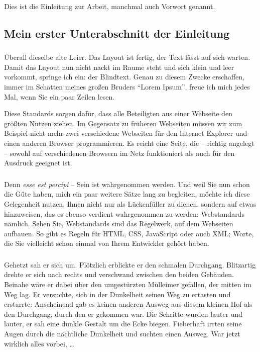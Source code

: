 
\thispagestyle{empty}
\label{sec:einleitung}
%
Dies ist die Einleitung zur Arbeit, manchmal auch Vorwort genannt.
%
\subsection*{Mein erster Unterabschnitt der Einleitung}
\subsubsection{}
Überall dieselbe alte Leier. 
Das Layout ist fertig, der Text lässt auf sich warten. 
Damit das Layout nun nicht nackt im Raume steht und sich klein und leer vorkommt, springe ich ein: der Blindtext. 
Genau zu diesem Zwecke erschaffen, immer im Schatten meines großen Bruders \enquote{Lorem Ipsum}, freue ich mich jedes Mal, wenn Sie ein paar Zeilen lesen. 

Diese Standards sorgen dafür, dass alle Beteiligten aus einer Webseite den größten Nutzen ziehen.
Im Gegensatz zu früheren Webseiten müssen wir zum Beispiel nicht mehr zwei verschiedene Webseiten für den Internet Explorer und einen anderen Browser programmieren.
Es reicht eine Seite, die -- richtig angelegt -- sowohl auf verschiedenen Browsern im Netz funktioniert als auch für den Ausdruck geeignet ist.
\subsubsection{}
Denn \emph{esse est percipi} -- Sein ist wahrgenommen werden. Und weil Sie nun schon die Güte haben, mich ein paar weitere Sätze lang zu begleiten, möchte ich diese Gelegenheit nutzen, Ihnen nicht nur als Lückenfüller zu dienen, sondern auf etwas hinzuweisen, das es ebenso verdient wahrgenommen zu werden: Webstandards nämlich. Sehen Sie, Webstandards sind das Regelwerk, auf dem Webseiten aufbauen. So gibt es Regeln für HTML, CSS, JavaScript oder auch XML; Worte, die Sie vielleicht schon einmal von Ihrem Entwickler gehört haben.  
\subsubsection{}
Gehetzt sah er sich um. Plötzlich erblickte er den schmalen Durchgang. Blitzartig drehte er sich nach rechts und verschwand zwischen den beiden Gebäuden. 
Beinahe wäre er dabei über den umgestürzten Mülleimer gefallen, der mitten im Weg lag. 
Er versuchte, sich in der Dunkelheit seinen Weg zu ertasten und erstarrte: Anscheinend gab es keinen anderen Ausweg aus diesem kleinen Hof als den Durchgang, durch den er gekommen war. 
Die Schritte wurden lauter und lauter, er sah eine dunkle Gestalt um die Ecke biegen. 
Fieberhaft irrten seine Augen durch die nächtliche Dunkelheit und suchten einen Ausweg. 
War jetzt wirklich alles vorbei, \ldots
